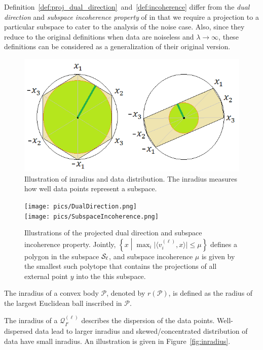 \documentclass{ctexart}
\begin{document}
Definition~\ref{def:proj_dual_direction}~and~\ref{def:incoherence} differ from the \emph{dual direction} and \emph{subspace incoherence property} of \cite{soltanolkotabi2011geometric} in that we require a projection to a particular subspace to cater to the analysis of the noise case. Also, since they reduce to the original definitions when data are noiseless and $\lambda\rightarrow \infty$, these definitions can be considered as a generalization of their original version.

%
\begin{figure}
  \centering
  \includegraphics[width=0.7\linewidth]{pics/inradius.png}\\
  \caption{Illustration of inradius and data distribution. The inradius measures how well data points represent a subspace. }\label{fig:inradius}
  \texttt{[image: pics/DualDirection.png]}\\
  \texttt{[image: pics/SubspaceIncoherence.png]}
  \caption{Illustrations of the projected dual direction and subspace incoherence property. Jointly, $\left\{x \middle| \max_{i}\big|\langle v_i^{(\ell)},x\rangle\big|\leq \mu\right\}$ defines a polygon in the subspace $\mathcal{S}_\ell$, and subspace incoherence $\mu$ is given by the smallest such polytope that contains the projections of all external point $y$ into the this subspace.}\label{fig:SubspaceIncoherence}
\end{figure}



\begin{definition}[inradius]
The inradius of a convex body $\mathcal{P}$, denoted by $r(\mathcal{P})$, is defined as the radius of the largest Euclidean ball inscribed in $\mathcal{P}$.
\end{definition}
The inradius of a $\mathcal{Q}_{I^c}^{(\ell)}$ describes the dispersion of the data points. Well-dispersed data lead to larger inradius and skewed/concentrated distribution of data have small inradius. An illustration is given in Figure~\ref{fig:inradius}.
\end{document}
